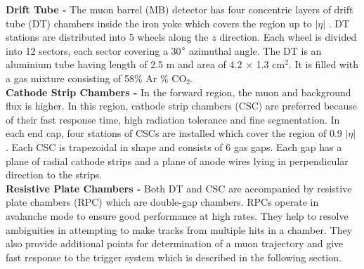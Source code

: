 {\bf Drift Tube -} 
The muon barrel (MB) detector has four concentric layers of drift tube (DT) chambers inside the iron yoke which covers the region up to $|\eta|$ . DT stations are distributed into 5 wheels along the $z$ direction. Each wheel is divided into 12 sectors, each sector covering a 30$\degree$ azimuthal angle. The DT is an aluminium tube having length of 2.5 m and area of 4.2 $\times$ 1.3 cm$^{2}$. It is filled with a gas mixture consisting of 58\% Ar  \% CO$_{2}$. \\ \newline
{\bf Cathode Strip Chambers -} In the forward region, the muon and background flux is higher. In this region, cathode strip chambers (CSC) are preferred because of their fast response time, high radiation tolerance and fine segmentation. In each end cap, four stations of CSCs are installed which cover the region of 0.9 \ls $|\eta|$ . Each CSC is trapezoidal in shape and consists of 6 gas gaps. Each gap has a plane of radial cathode strips and a plane of anode wires lying in perpendicular direction to the strips. \\ \newline 
{\bf Resistive Plate Chambers -} Both DT and CSC are accompanied by resistive plate chambers (RPC) which are double-gap chambers. RPCs operate in avalanche mode to ensure good performance at high rates. They help to resolve ambiguities in attempting to make tracks from multiple hits in a chamber. They also provide additional points for determination of a muon trajectory and give fast response to the trigger system which is described in the following section.
